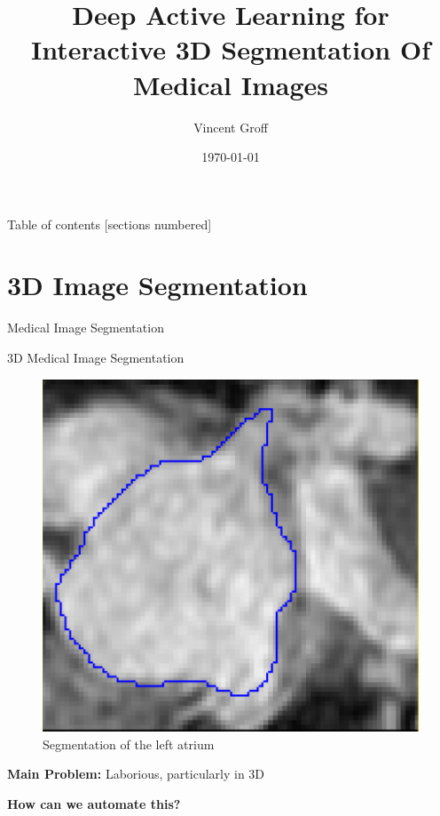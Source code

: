 \documentclass[10pt]{beamer}
\title{Deep Active Learning for Interactive 3D Segmentation Of Medical Images}
\date{\today}
\author{Vincent Groff}
\begin{document}
\maketitle

\begin{frame}{Table of contents}
  [sections numbered]
  \tableofcontents[hideallsubsections]
\end{frame}



\section{3D Image Segmentation}

\begin{frame}[fragile]{Medical Image Segmentation}

    \begin{block}{3D Medical Image Segmentation}
    \end{block}
    
    \begin{figure}[h!]
    \centering
    \includegraphics[scale=0.20]{pictures/seg}
    \caption{Segmentation of the left atrium}
    \label{fig:heartSegTruth}
    \end{figure}
        
    \textbf{Main Problem:} Laborious, particularly in 3D
    \pause
    
    \textbf{How can we automate this?}
\end{frame}
\end{document}
